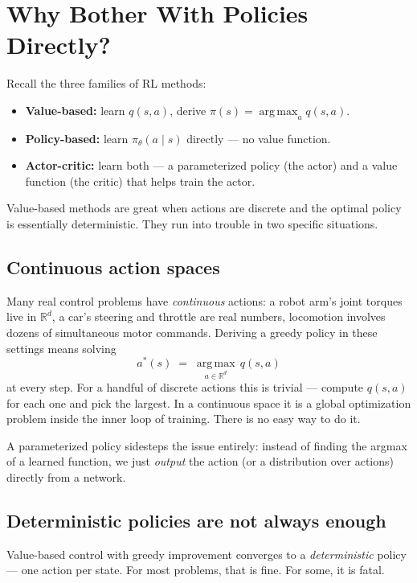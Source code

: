 \documentclass[11pt, oneside]{book}
\newcommand{\R}{\mathbb{R}}
\newcommand{\argmax}{\operatorname*{arg\,max}}
\begin{document}
\section{Why Bother With Policies Directly?}

Recall the three families of RL methods:
\begin{itemize}
  \item \textbf{Value-based:} learn $q(s,a)$, derive $\pi(s) = \argmax_a q(s,a)$.
  \item \textbf{Policy-based:} learn $\pi_\theta(a \mid s)$ directly --- no value function.
  \item \textbf{Actor-critic:} learn both --- a parameterized policy (the actor) and a
    value function (the critic) that helps train the actor.
\end{itemize}

Value-based methods are great when actions are discrete and the optimal policy is
essentially deterministic. They run into trouble in two specific situations.

\subsection{Continuous action spaces}

Many real control problems have \emph{continuous} actions: a robot arm's joint
torques live in $\R^d$, a car's steering and throttle are real numbers, locomotion
involves dozens of simultaneous motor commands.
Deriving a greedy policy in these settings means solving
\[
  a^*(s) \;=\; \argmax_{a \in \R^d}\, q(s,a)
\]
at every step.
For a handful of discrete actions this is trivial --- compute $q(s,a)$ for each one
and pick the largest.
In a continuous space it is a global optimization problem inside the inner loop of
training.
There is no easy way to do it.

A parameterized policy sidesteps the issue entirely: instead of finding the argmax
of a learned function, we just \emph{output} the action (or a distribution over
actions) directly from a network.

\subsection{Deterministic policies are not always enough}

Value-based control with greedy improvement converges to a \emph{deterministic}
policy --- one action per state.
For most problems, that is fine. For some, it is fatal.
\end{document}
